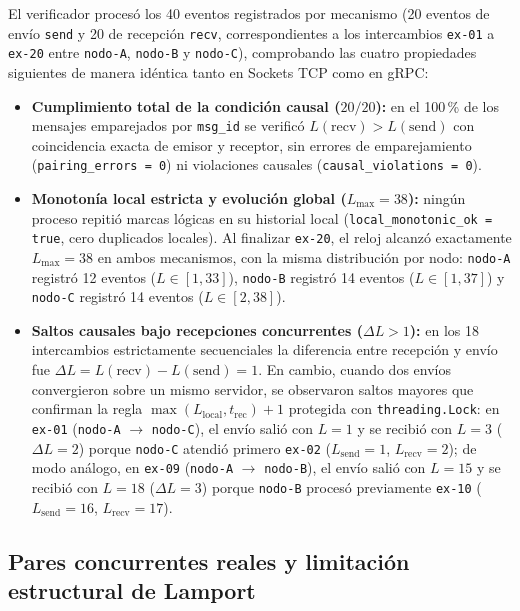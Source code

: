 \documentclass[12pt,a4paper]{article}
\begin{document}
El verificador procesó los 40 eventos registrados por mecanismo (20 eventos de envío \texttt{send} y 20 de recepción \texttt{recv}, correspondientes a los intercambios \texttt{ex-01} a \texttt{ex-20} entre \texttt{nodo-A}, \texttt{nodo-B} y \texttt{nodo-C}), comprobando las cuatro propiedades siguientes de manera idéntica tanto en Sockets TCP como en gRPC:
\begin{itemize}
  \item \textbf{Cumplimiento total de la condición causal ($20/20$):} en el 100\,\% de los mensajes emparejados por \texttt{msg\_id} se verificó $L(\mathrm{recv}) > L(\mathrm{send})$ con coincidencia exacta de emisor y receptor, sin errores de emparejamiento (\texttt{pairing\_errors = 0}) ni violaciones causales (\texttt{causal\_violations = 0}).
  \item \textbf{Monotonía local estricta y evolución global ($L_{\max} = 38$):} ningún proceso repitió marcas lógicas en su historial local (\texttt{local\_monotonic\_ok = true}, cero duplicados locales). Al finalizar \texttt{ex-20}, el reloj alcanzó exactamente $L_{\max} = 38$ en ambos mecanismos, con la misma distribución por nodo: \texttt{nodo-A} registró 12 eventos ($L \in [1, 33]$), \texttt{nodo-B} registró 14 eventos ($L \in [1, 37]$) y \texttt{nodo-C} registró 14 eventos ($L \in [2, 38]$).
  \item \textbf{Saltos causales bajo recepciones concurrentes ($\Delta L > 1$):} en los 18 intercambios estrictamente secuenciales la diferencia entre recepción y envío fue $\Delta L = L(\mathrm{recv}) - L(\mathrm{send}) = 1$. En cambio, cuando dos envíos convergieron sobre un mismo servidor, se observaron saltos mayores que confirman la regla $\max(L_{\mathrm{local}}, t_{\mathrm{rec}}) + 1$ protegida con \texttt{threading.Lock}: en \texttt{ex-01} (\texttt{nodo-A} $\to$ \texttt{nodo-C}), el envío salió con $L = 1$ y se recibió con $L = 3$ ($\Delta L = 2$) porque \texttt{nodo-C} atendió primero \texttt{ex-02} ($L_{\mathrm{send}} = 1$, $L_{\mathrm{recv}} = 2$); de modo análogo, en \texttt{ex-09} (\texttt{nodo-A} $\to$ \texttt{nodo-B}), el envío salió con $L = 15$ y se recibió con $L = 18$ ($\Delta L = 3$) porque \texttt{nodo-B} procesó previamente \texttt{ex-10} ($L_{\mathrm{send}} = 16$, $L_{\mathrm{recv}} = 17$).
\end{itemize}

\subsection{Pares concurrentes reales y limitación estructural de Lamport}
\end{document}
